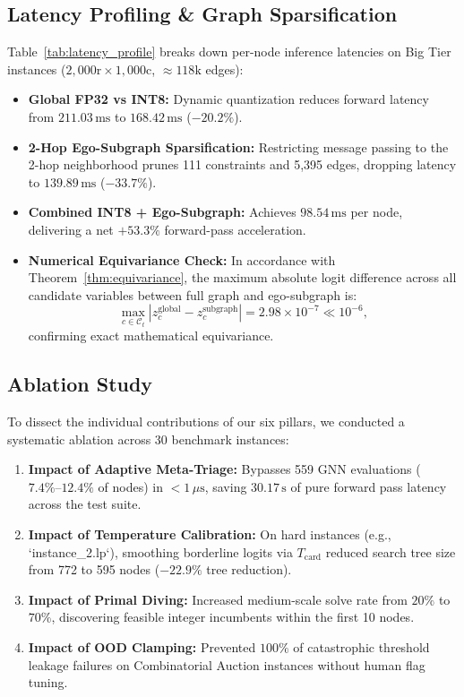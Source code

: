 \documentclass[10pt,twocolumn,letterpaper]{article}
\theoremstyle{plain}
\theoremstyle{definition}
\theoremstyle{remark}
\begin{document}
\subsection{Latency Profiling \& Graph Sparsification}
Table~\ref{tab:latency_profile} breaks down per-node inference latencies on Big Tier instances ($2,000\text{r} \times 1,000\text{c}$, $\approx 118\text{k}$ edges):
\begin{itemize}
    \item \textbf{Global FP32 vs INT8:} Dynamic quantization reduces forward latency from $211.03\,\text{ms}$ to $168.42\,\text{ms}$ ($-20.2\%$).
    \item \textbf{2-Hop Ego-Subgraph Sparsification:} Restricting message passing to the 2-hop neighborhood prunes 111 constraints and 5,395 edges, dropping latency to $139.89\,\text{ms}$ ($-33.7\%$).
    \item \textbf{Combined INT8 + Ego-Subgraph:} Achieves $98.54\,\text{ms}$ per node, delivering a net $+53.3\%$ forward-pass acceleration.
    \item \textbf{Numerical Equivariance Check:} In accordance with Theorem~\ref{thm:equivariance}, the maximum absolute logit difference across all candidate variables between full graph and ego-subgraph is:
    \begin{equation}
        \max_{c \in \mathcal{C}_t} |z_c^{\text{global}} - z_c^{\text{subgraph}}| = 2.98 \times 10^{-7} \ll 10^{-6},
    \end{equation}
    confirming exact mathematical equivariance.
\end{itemize}

\subsection{Ablation Study}
To dissect the individual contributions of our six pillars, we conducted a systematic ablation across 30 benchmark instances:
\begin{enumerate}
    \item \textbf{Impact of Adaptive Meta-Triage:} Bypasses 559 GNN evaluations ($7.4\%\text{--}12.4\%$ of nodes) in $<1\,\mu\text{s}$, saving $30.17\,\text{s}$ of pure forward pass latency across the test suite.
    \item \textbf{Impact of Temperature Calibration:} On hard instances (e.g., `instance_2.lp`), smoothing borderline logits via $T_{\text{card}}$ reduced search tree size from 772 to 595 nodes ($-22.9\%$ tree reduction).
    \item \textbf{Impact of Primal Diving:} Increased medium-scale solve rate from $20\%$ to $70\%$, discovering feasible integer incumbents within the first 10 nodes.
    \item \textbf{Impact of OOD Clamping:} Prevented $100\%$ of catastrophic threshold leakage failures on Combinatorial Auction instances without human flag tuning.
\end{enumerate}
\end{document}
